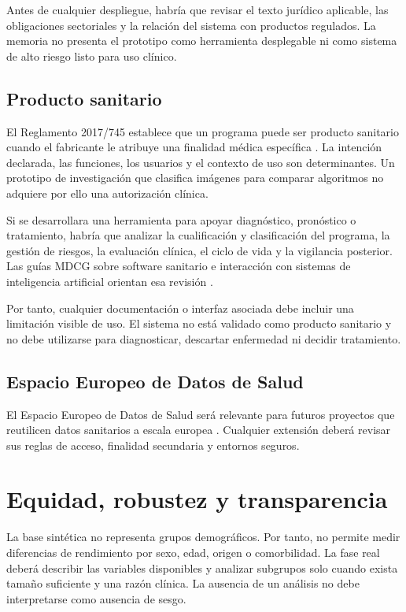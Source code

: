 Antes de cualquier despliegue, habría que revisar el texto jurídico aplicable, las obligaciones sectoriales y la relación del sistema con productos regulados. La memoria no presenta el prototipo como herramienta desplegable ni como sistema de alto riesgo listo para uso clínico.

\subsection{Producto sanitario}

El Reglamento 2017/745 establece que un programa puede ser producto sanitario cuando el fabricante le atribuye una finalidad médica específica \cite{mdr2017}. La intención declarada, las funciones, los usuarios y el contexto de uso son determinantes. Un prototipo de investigación que clasifica imágenes para comparar algoritmos no adquiere por ello una autorización clínica.

Si se desarrollara una herramienta para apoyar diagnóstico, pronóstico o tratamiento, habría que analizar la cualificación y clasificación del programa, la gestión de riesgos, la evaluación clínica, el ciclo de vida y la vigilancia posterior. Las guías MDCG sobre software sanitario e interacción con sistemas de inteligencia artificial orientan esa revisión \cite{mdcg2019rev1,mdcg2025six}.

Por tanto, cualquier documentación o interfaz asociada debe incluir una limitación visible de uso. El sistema no está validado como producto sanitario y no debe utilizarse para diagnosticar, descartar enfermedad ni decidir tratamiento.

\subsection{Espacio Europeo de Datos de Salud}

El Espacio Europeo de Datos de Salud será relevante para futuros proyectos que reutilicen datos sanitarios a escala europea \cite{ehds2025}. Cualquier extensión deberá revisar sus reglas de acceso, finalidad secundaria y entornos seguros.

\section{Equidad, robustez y transparencia}

La base sintética no representa grupos demográficos. Por tanto, no permite medir diferencias de rendimiento por sexo, edad, origen o comorbilidad. La fase real deberá describir las variables disponibles y analizar subgrupos solo cuando exista tamaño suficiente y una razón clínica. La ausencia de un análisis no debe interpretarse como ausencia de sesgo.

